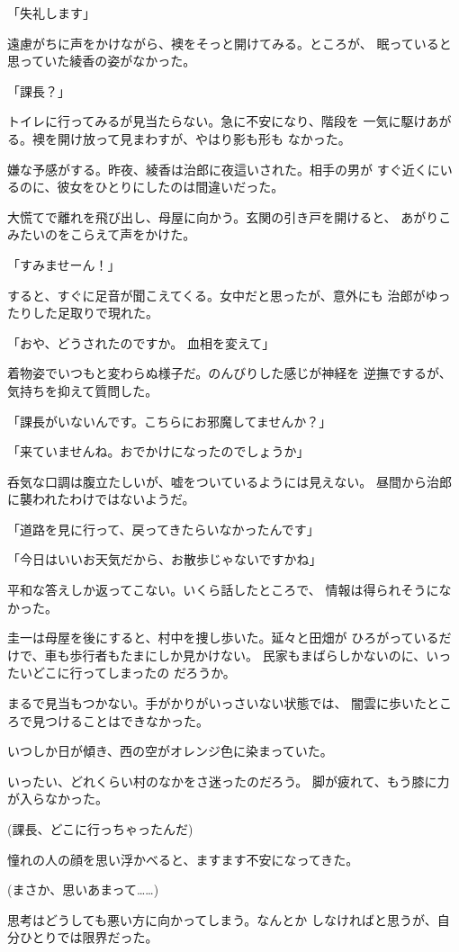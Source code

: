 ﻿\documentclass[
    book,tate,
    line_length=30zw,
    jafontsize=12pt,
    paper=b5j,
    landscape,
    ]{jlreq}
\begin{document}
「失礼します」

遠慮がちに声をかけながら、襖をそっと開けてみる。ところが、
眠っていると思っていた綾香の姿がなかった。

「課長？」

トイレに行ってみるが見当たらない。急に不安になり、階段を
一気に駆けあがる。襖を開け放って見まわすが、やはり影も形も
なかった。

嫌な予感がする。昨夜、綾香は治郎に夜這いされた。相手の男が
すぐ近くにいるのに、彼女をひとりにしたのは間違いだった。

大慌てで離れを飛び出し、母屋に向かう。玄関の引き戸を開けると、
あがりこみたいのをこらえて声をかけた。

「すみませーん！」

すると、すぐに足音が聞こえてくる。女中だと思ったが、意外にも
治郎がゆったりした足取りで現れた。

「おや、どうされたのですか。 血相を変えて」

着物姿でいつもと変わらぬ様子だ。のんびりした感じが神経を
逆撫でするが、気持ちを抑えて質問した。

「課長がいないんです。こちらにお邪魔してませんか？」

「来ていませんね。おでかけになったのでしょうか」

呑気な口調は腹立たしいが、嘘をついているようには見えない。
昼間から治郎に襲われたわけではないようだ。

「道路を見に行って、戻ってきたらいなかったんです」

「今日はいいお天気だから、お散歩じゃないですかね」

平和な答えしか返ってこない。いくら話したところで、
情報は得られそうになかった。

圭一は母屋を後にすると、村中を捜し歩いた。延々と田畑が
ひろがっているだけで、車も歩行者もたまにしか見かけない。
民家もまばらしかないのに、いったいどこに行ってしまったの
だろうか。

まるで見当もつかない。手がかりがいっさいない状態では、
闇雲に歩いたところで見つけることはできなかった。

いつしか日が傾き、西の空がオレンジ色に染まっていた。

いったい、どれくらい村のなかをさ迷ったのだろう。
脚が疲れて、もう膝に力が入らなかった。

(課長、どこに行っちゃったんだ)

憧れの人の顔を思い浮かべると、ますます不安になってきた。

(まさか、思いあまって……)

思考はどうしても悪い方に向かってしまう。なんとか
しなければと思うが、自分ひとりでは限界だった。
\end{document}
